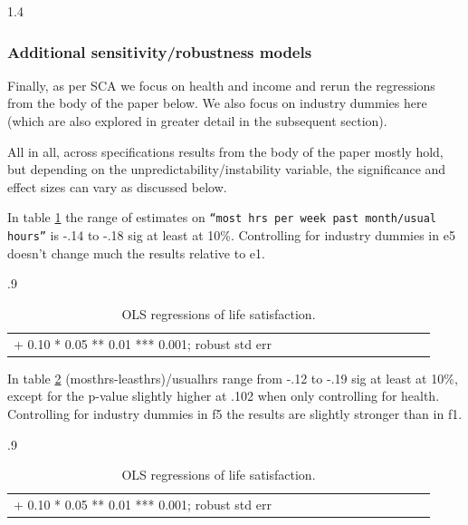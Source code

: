 \documentclass[10pt, letterpaper]{article}
\begin{document}
\begin{spacing}{1.4}
\subsubsection{Additional sensitivity/robustness models} 

Finally, as per SCA we focus on health and income and rerun the regressions from the
body of the paper below. We also focus on industry dummies here (which are also explored in greater detail in the subsequent section).

All in all, across specifications results from the body of the paper mostly hold, but depending on the unpredictability/instability variable, the significance and effect sizes can vary as discussed below. 

In table \ref{regE} the range of estimates on \texttt{``most hrs per week past month/usual hours''}
is -.14 to -.18 sig at least at 10\%. Controlling for industry dummies in e5
doesn't change much the results relative to e1. 

\begin{spacing}{.9} \begin{table}[H]\centering   \begin{scriptsize} \begin{tabular}{p{1.8in}p{.5in}p{.5in}p{.5in}p{.5in}p{.5in}p{.5in}p{.5in}p{.5in}p{.5in}p{.5 in}p{.5in}p{.5 in}}\hline  \hline + 0.10 * 0.05 ** 0.01 *** 0.001; robust std err \end{tabular}\end{scriptsize}\caption{\label{regE}OLS regressions of life satisfaction.}\end{table} \end{spacing}


In table \ref{regF}
(mosthrs-leasthrs)/usualhrs range from -.12 to -.19 sig at least at 10\%, except for the p-value slightly higher at .102
when only controlling for health. Controlling for industry dummies in f5 the results are slightly stronger than in f1.

\begin{spacing}{.9} \begin{table}[H]\centering   \begin{scriptsize} \begin{tabular}{p{1.8in}p{.5in}p{.5in}p{.5in}p{.5in}p{.5in}p{.5in}p{.5in}p{.5in}p{.5in}p{.5 in}p{.5in}p{.5 in}}\hline  \hline + 0.10 * 0.05 ** 0.01 *** 0.001; robust std err \end{tabular}\end{scriptsize}\caption{\label{regF}OLS regressions of life satisfaction.}\end{table} \end{spacing}



\end{spacing}
\end{document}

